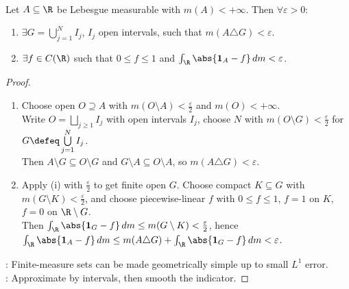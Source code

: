 \begin{proposition} \label{prop:finite-measure-indicator-continuous-l1-approximation} \\
Let $A\subseteq\R$ be Lebesgue measurable with $m(A)<+\infty$. Then $\forall\varepsilon>0$:
\begin{enumerate}[label=(\roman*)]
\setlength{\itemsep}{0pt}
\item $\exists G=\bigcup\limits_{j=1}^{N}I_j$, $I_j$ open intervals, such that $m(A\triangle G)<\varepsilon$.
\item $\exists f\in C(\R)$ such that $0\leq f\leq1$ and $\int_{\R}\abs{\mathbf{1}_A-f}\,dm<\varepsilon$.
\end{enumerate}
\begin{proof}
\begin{enumerate}[label=(\roman*)]
\setlength{\itemsep}{0pt}
\item Choose open $O\supseteq A$ with $m(O\setminus A)<\frac{\varepsilon}{2}$ and $m(O)<+\infty$.\\
Write $O=\bigsqcup\limits_{j\geq1}I_j$ with open intervals $I_j$, choose $N$ with $m(O\setminus G)<\frac{\varepsilon}{2}$ for $G\defeq\bigcup\limits_{j=1}^{N}I_j$.\\
Then $A\setminus G\subseteq O\setminus G$ and $G\setminus A\subseteq O\setminus A$, so $m(A\triangle G)<\varepsilon$.
\item Apply (i) with $\frac{\varepsilon}{2}$ to get finite open $G$. Choose compact $K\subseteq G$ with $m(G\setminus K)<\frac{\varepsilon}{2}$, and choose piecewise-linear $f$ with $0\leq f\leq1$, $f=1$ on $K$, $f=0$ on $\R\setminus G$.\\
Then $\int_{\R}\abs{\mathbf{1}_G-f}\,dm\leq m(G\setminus K)<\frac{\varepsilon}{2}$, hence $\int_{\R}\abs{\mathbf{1}_A-f}\,dm\leq m(A\triangle G)+\int_{\R}\abs{\mathbf{1}_G-f}\,dm<\varepsilon$.
\end{enumerate}
: Finite-measure sets can be made geometrically simple up to small $L^1$ error.\\
: Approximate by intervals, then smooth the indicator.
\end{proof}
\end{proposition}

